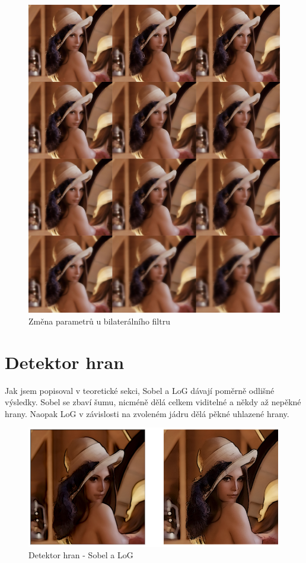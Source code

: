 \documentclass[11pt,oneside]{article}
\begin{document}
\begin{figure}[!htb]
\centering
\includegraphics[width=1.0\textwidth]{bilateral-parametry.jpg}
\caption{Změna parametrů u bilaterálního filtru}
\end{figure}

\clearpage

\section{Detektor hran}

Jak jsem popisoval v teoretické sekci, Sobel a LoG dávají poměrně odlišné výsledky. Sobel se zbaví šumu, nicméně dělá celkem viditelné a někdy až nepěkné hrany. Naopak LoG v závislosti na zvoleném jádru dělá pěkné uhlazené hrany.

\begin{figure}[!htb]
\centering
\includegraphics[width=1.0\textwidth]{edge-01.png}
\caption{Detektor hran - Sobel a LoG}
\end{figure}
\end{document}
